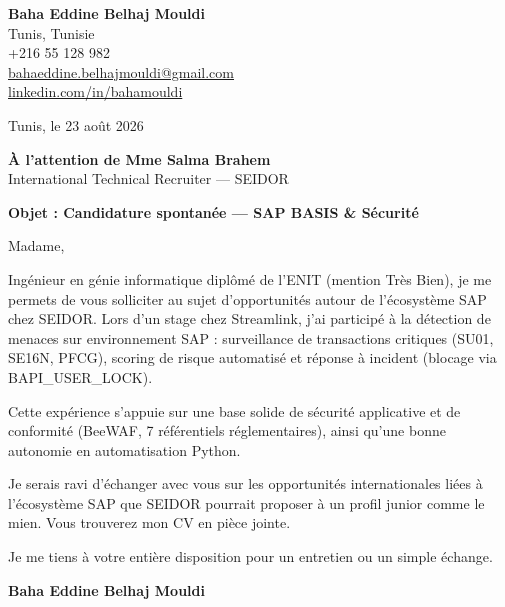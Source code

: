 \documentclass[a4paper,11pt]{article}
\begin{document}
\begin{flushright}
{\bfseries Baha Eddine Belhaj Mouldi}\\
Tunis, Tunisie\\
+216 55 128 982\\
\href{mailto:bahaeddine.belhajmouldi@gmail.com}{bahaeddine.belhajmouldi@gmail.com}\\
\href{https://linkedin.com/in/bahamouldi}{linkedin.com/in/bahamouldi}
\end{flushright}
\vspace{0.8cm}
\begin{flushleft}
Tunis, le 23 ao\^ut 2026
\vspace{0.8cm}

{\bfseries \`A l'attention de Mme Salma Brahem}\\
International Technical Recruiter --- SEIDOR
\vspace{0.6cm}

{\bfseries Objet : Candidature spontan\'ee --- SAP BASIS \& S\'ecurit\'e}
\end{flushleft}
\vspace{0.6cm}
Madame,

Ing\'enieur en g\'enie informatique dipl\^om\'e de l'ENIT (mention Tr\`es Bien), je me permets de vous solliciter au sujet d'opportunit\'es autour de l'\'ecosyst\`eme SAP chez SEIDOR. Lors d'un stage chez Streamlink, j'ai particip\'e \`a la d\'etection de menaces sur environnement SAP : surveillance de transactions critiques (SU01, SE16N, PFCG), scoring de risque automatis\'e et r\'eponse \`a incident (blocage via BAPI\_USER\_LOCK).

Cette exp\'erience s'appuie sur une base solide de s\'ecurit\'e applicative et de conformit\'e (BeeWAF, 7 r\'ef\'erentiels r\'eglementaires), ainsi qu'une bonne autonomie en automatisation Python.

Je serais ravi d'\'echanger avec vous sur les opportunit\'es internationales li\'ees \`a l'\'ecosyst\`eme SAP que SEIDOR pourrait proposer \`a un profil junior comme le mien. Vous trouverez mon CV en pi\`ece jointe.

Je me tiens \`a votre enti\`ere disposition pour un entretien ou un simple \'echange.

\vspace{0.8cm}
\begin{flushright}
{\bfseries Baha Eddine Belhaj Mouldi}
\end{flushright}
\end{document}
